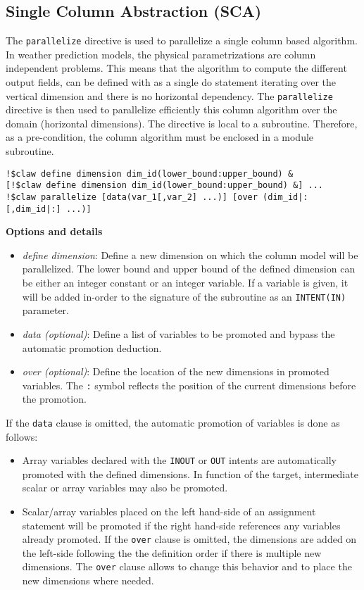 \subsection{Single Column Abstraction (SCA)}

The \lstinline!parallelize! directive is used to parallelize a single column based
algorithm. In weather prediction models, the physical parametrizations are
column independent problems. This means that the algorithm to compute the
different output fields, can be defined with as a single do statement
iterating over the vertical dimension and there is no horizontal dependency.
The \lstinline!parallelize! directive is then used to parallelize efficiently
this column algorithm over the domain (horizontal dimensions).
The directive is local to a subroutine. Therefore, as a pre-condition, the
column algorithm must be enclosed in a module subroutine.

\begin{lstlisting}
!$claw define dimension dim_id(lower_bound:upper_bound) &
[!$claw define dimension dim_id(lower_bound:upper_bound) &] ...
!$claw parallelize [data(var_1[,var_2] ...)] [over (dim_id|:[,dim_id|:] ...)]
\end{lstlisting}

\textbf{Options and details}
\begin{itemize}
\item \textit{define dimension}: Define a new dimension on which the column
model will be parallelized. The lower bound and upper bound of the defined
dimension can be either an integer constant or an integer variable. If a
variable is given, it will be added in-order to the signature of the subroutine
as an \lstinline!INTENT(IN)! parameter.
\item \textit{data (optional)}: Define a list of variables to be promoted and
bypass the automatic promotion deduction.
\item \textit{over (optional)}: Define the location of the new dimensions in
promoted variables. The \lstinline!:! symbol reflects the position of the
current dimensions before the promotion.
\end{itemize}

If the \lstinline!data! clause is omitted, the automatic promotion of variables
is done as follows:
\begin{itemize}
\item Array variables declared with the \lstinline!INOUT! or \lstinline!OUT!
intents are automatically promoted with the defined dimensions.
In function of the target, intermediate scalar or array variables may also be
promoted.
\item Scalar/array variables placed on the left hand-side of an assignment
statement will be promoted if the right hand-side references any variables
already promoted. If the \lstinline!over! clause is omitted, the dimensions are
added on the left-side following the the definition order if there is multiple
new dimensions. The \lstinline!over! clause allows to change this behavior and
to place the new dimensions where needed.
\end{itemize}

